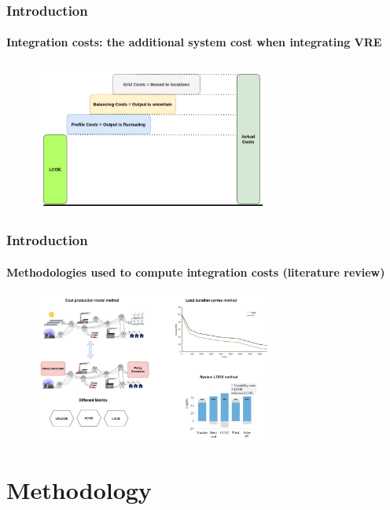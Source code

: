 \documentclass[aspectratio=169]{beamer}
\begin{document}
\begin{frame}
  \frametitle{Introduction}
  \framesubtitle{Integration costs: the additional system cost
when integrating VRE}
  \begin{figure}
    \centering
    \includegraphics[width=0.7\textwidth]{prof.png}
  \end{figure}
\end{frame}


\begin{frame}
\frametitle{Introduction}
\framesubtitle{Methodologies used to compute integration costs (literature review)}
  \begin{figure}
    \centering
    \includegraphics[width=0.7\textwidth]{mehod.png}
  \end{figure}
\end{frame}

\section{Methodology}
\end{document}
